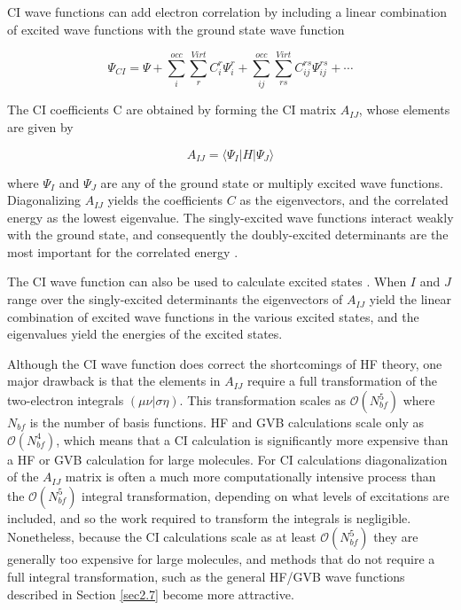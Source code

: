 CI wave functions can add electron correlation by including a linear
combination of excited wave functions with the ground
state wave function \cite{Szabo82}

\begin{equation}
  \Psi_{CI} = \Psi + \sum_i^{occ} \sum_r^{Virt}C_i^r\Psi_i^r +
	\sum_{ij}^{occ} \sum_{rs}^{Virt}C_{ij}^{rs}\Psi_{ij}^{rs}+\cdots
\end{equation}

\noindent The CI coefficients C are obtained by forming the CI matrix
$A_{IJ}$, whose elements are given by

\begin{equation}
  A_{IJ} = \langle \Psi_I | H | \Psi_J \rangle 
\end{equation}

\noindent where $\Psi_I$ and $\Psi_J$ are any of the ground state or
multiply excited wave functions. Diagonalizing $A_{IJ}$ yields the
coefficients $C$ as the eigenvectors, and the correlated energy as the
lowest eigenvalue. The singly-excited wave functions interact weakly
with the ground state, and consequently the doubly-excited
determinants are the most important for the correlated energy
\cite{Szabo82}.

The CI wave function can also be used to calculate excited states
\cite{Foresman92}. When $I$ and $J$ range over the singly-excited
determinants the eigenvectors of $A_{IJ}$ yield the linear combination
of excited wave functions in the various excited states, and the 
eigenvalues yield the energies of the excited states.

Although the CI wave function does correct the shortcomings of HF
theory, one major drawback is that the elements in $A_{IJ}$ require a
full transformation of the two-electron integrals
$(\mu\nu|\sigma\eta)$. This transformation scales as
$\mathcal{O}(N_{bf}^5)$ where $N_{bf}$ is the number of basis
functions. HF and GVB calculations scale only as
$\mathcal{O}(N_{bf}^4)$, which means that a CI calculation is
significantly more expensive than a HF or GVB calculation for large
molecules. For CI calculations diagonalization of the $A_{IJ}$ matrix
is often a much more computationally intensive process than the
$\mathcal{O}(N_{bf}^5)$ integral transformation, depending on what
levels of excitations are included, and so the work required to
transform the integrals is negligible. Nonetheless, because the CI
calculations scale as at least $\mathcal{O}(N_{bf}^5)$ they are
generally too expensive for large molecules, and methods that do not
require a full integral transformation, such as the general HF/GVB
wave functions described in Section \ref{sec2.7} become more
attractive.

